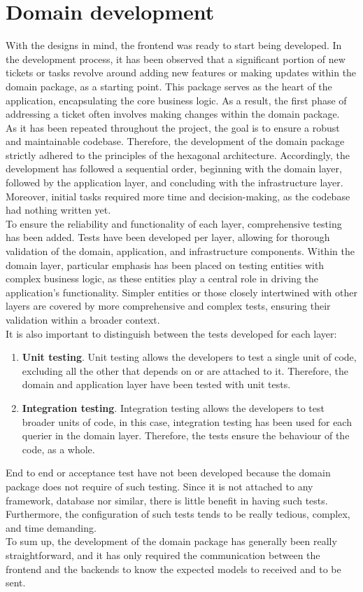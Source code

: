 \documentclass[./memory.tex]{subfiles}
\begin{document}
\section{Domain development}
With the designs in mind, the frontend was ready to start being developed. In
the development process, it has been observed that a significant portion of new
tickets or tasks revolve around adding new features or making updates within the
domain package, as a starting point. This package serves as the heart of the
application, encapsulating the core business logic. As a result, the first phase
of addressing a ticket often involves making changes within the domain package.
\\[8pt]
As it has been repeated throughout the project, the goal is to ensure a robust
and maintainable codebase. Therefore, the development of the domain package
strictly adhered to the principles of the hexagonal architecture. Accordingly,
the development has followed a sequential order, beginning with the domain
layer, followed by the application layer, and concluding with the infrastructure
layer.
\\
Moreover, initial tasks required more time and decision-making, as the
codebase had nothing written yet.
\\[8pt]
To ensure the reliability and functionality of each layer, comprehensive testing
has been added. Tests have been developed per layer, allowing for thorough
validation of the domain, application, and infrastructure components. Within the
domain layer, particular emphasis has been placed on testing entities with
complex business logic, as these entities play a central role in driving the
application's functionality. Simpler entities or those closely intertwined with
other layers are covered by more comprehensive and complex tests, ensuring their
validation within a broader context.
\\
It is also important to distinguish between the tests developed for each layer:
\begin{enumerate}[label = -]
	\item\textbf{Unit testing}. Unit testing allows the developers to test a
	single unit of code, excluding all the other that depends on or are
	attached to it. Therefore, the domain and application layer have been
	tested with unit tests.
	\item\textbf{Integration testing}. Integration testing allows the developers
	to test broader units of code, in this case, integration testing has been
	used for each querier in the domain layer. Therefore, the tests ensure the
	behaviour of the code, as a whole.
\end{enumerate}
End to end or acceptance test have not been developed because the domain package
does not require of such testing. Since it is not attached to any framework,
database nor similar, there is little benefit in having such tests. Furthermore,
the configuration of such tests tends to be really tedious, complex, and time
demanding.
\\[8pt]
To sum up, the development of the domain package has generally been really
straightforward, and it has only required the communication between the frontend
and the backends to know the expected models to received and to be sent.
\end{document}
